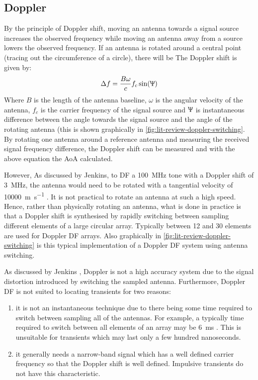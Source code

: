 \subsection{Doppler}
By the principle of Doppler shift, moving an antenna towards a signal source increases the observed frequency while moving an antenna away from a source lowers the observed frequency. 
If an antenna is rotated around a central point (tracing out the circumference of a circle), there will be 
The Doppler shift is given by: \cite{poisel2012electronic}
\begin{equation}
  \Delta f = \frac{B\omega}{c}f_c\sin(\Uppsi)
\end{equation}
Where \(B\) is the length of the antenna baseline, \(\omega\) is the angular velocity of the antenna, \(f_c\) is the carrier frequency of the signal source and \(\Uppsi\) is instantaneous difference between the angle towards the signal source and the angle of the rotating antenna (this is shown graphically in \autoref{fig:lit-review-doppler-switching}. By rotating one antenna around a reference antenna and measuring the received signal frequency difference, the Doppler shift can be measured and with the above equation the AoA calculated.

However, As discussed by Jenkins, to DF a \SI{100}{\mega\hertz} tone with a Doppler shift of \SI{3}{\mega\hertz}, the antenna would need to be rotated with a tangential velocity of \SI{10000}{\metre\per\second} \cite{jenkins1991smallaperture}. 
It is not practical to rotate an antenna at such a high speed. 
Hence, rather than physically rotating an antenna, what is done in practice is that a Doppler shift is synthesised by rapidly switching between sampling different elements of a large circular array. 
Typically between 12 and 30 elements are used for Doppler DF arrays. 
Also graphically in \autoref{fig:lit-review-doppler-switching} is this typical implementation of a Doppler DF system using antenna switching.

As discussed by Jenkins \cite{jenkins1991smallaperture}, Doppler is not a high accuracy system due to the signal distortion introduced by switching the sampled antenna. Furthermore, Doppler DF is not suited to locating transients for two reasons:
\begin{enumerate}
  \item it is not an instantaneous technique due to there being some time required to switch between sampling all of the antennas. For example, a typically time required to switch between all elements of an array may be \SI{6}{\milli\second} \cite{rhode2000introtodf}. This is unsuitable for transients which may last only a few hundred nanoseconds.
  \item it generally needs a narrow-band signal which has a well defined carrier frequency so that the Doppler shift is well defined. Impulsive transients do not have this characteristic.
\end{enumerate}

